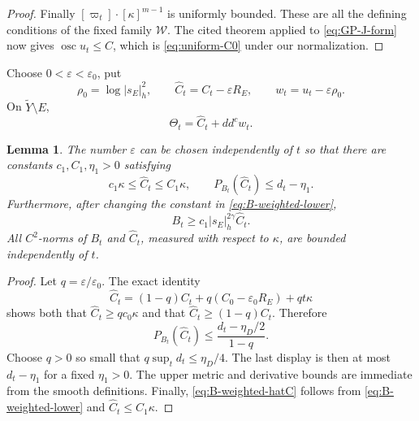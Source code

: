 \documentclass[reqno]{amsart}
\newcommand{\ddc}{dd^c}
\theoremstyle{plain}
\newtheorem{lemma}[thm]{Lemma}
\theoremstyle{remark}
\begin{document}
\begin{proof}
Finally $[\varpi_t]\cdot[\kappa]^{m-1}$ is uniformly bounded.  These are
all the defining conditions of the fixed family $\mathcal W$.
The cited theorem applied to \eqref{eq:GP-J-form} now gives
$\operatorname{osc}u_t\leq C$, which is
\eqref{eq:uniform-C0} under our normalization.
\end{proof}

Choose $0<\varepsilon<\varepsilon_0$, put
\begin{equation}\label{eq:rho-w-hatC}
 \rho_0=\log|s_E|_{h}^2,
 \qquad
 \widehat C_t=C_t-\varepsilon R_E,
 \qquad
 w_t=u_t-\varepsilon\rho_0.
\end{equation}
On $\widetilde Y\setminus E$,
\begin{equation}\label{eq:Theta-hatC-w}
 \Theta_t=\widehat C_t+\ddc w_t.
\end{equation}
\begin{lemma}
\label{lem:corrected-reference}
The number $\varepsilon$ can be chosen independently of $t$ so that
there are constants $c_1,C_1,\eta_1>0$ satisfying
\begin{equation}\label{eq:hatC-uniform}
 c_1\kappa\leq\widehat C_t\leq C_1\kappa,
 \qquad
 P_{B_t}(\widehat C_t)\leq d_t-\eta_1.
\end{equation}
Furthermore, after changing the constant in
\eqref{eq:B-weighted-lower},
\begin{equation}\label{eq:B-weighted-hatC}
 B_t\geq c_1|s_E|_{h}^{2\gamma}
 \widehat C_t.
\end{equation}
All $C^2$-norms of $B_t$ and $\widehat C_t$, measured with
respect to $\kappa$, are bounded independently of $t$.
\end{lemma}
\begin{proof}
Let $q=\varepsilon/\varepsilon_0$.  The exact identity
\[
 \widehat C_t
 =(1-q)C_t+q(C_0-\varepsilon_0R_E)+qt\kappa
\]
shows both that $\widehat C_t\geq qc_0\kappa$ and that
$\widehat C_t\geq(1-q)C_t$.  Therefore
\[
 P_{B_t}(\widehat C_t)
 \leq\frac{d_t-\eta_D/2}{1-q}.
\]
Choose $q>0$ so small that
$q\sup_t d_t\leq\eta_D/4$.  The last display is then at most
$d_t-\eta_1$ for a fixed $\eta_1>0$.  The upper metric and
derivative bounds are immediate from the smooth definitions.  Finally,
\eqref{eq:B-weighted-hatC} follows from
\eqref{eq:B-weighted-lower} and $\widehat C_t\leq C_1\kappa$.
\end{proof}
\end{document}
